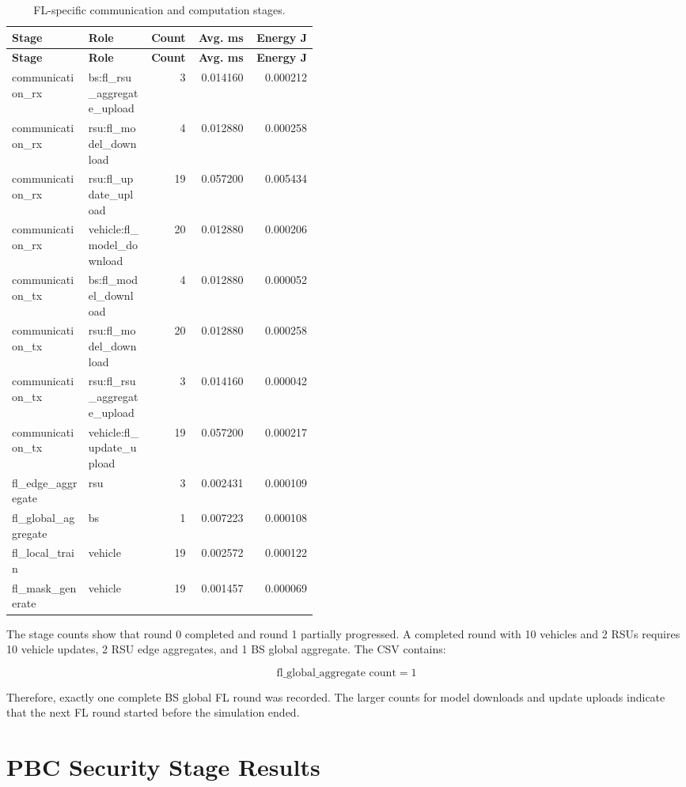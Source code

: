 \documentclass[11pt,a4paper]{article}
\begin{document}
\begin{longtable}{p{0.25\linewidth}p{0.20\linewidth}r r r}
\caption{FL-specific communication and computation stages.}\label{tab:fl-stages}\\
\toprule
\textbf{Stage} & \textbf{Role} & \textbf{Count} & \textbf{Avg. ms} & \textbf{Energy J} \\
\midrule
\endfirsthead
\toprule
\textbf{Stage} & \textbf{Role} & \textbf{Count} & \textbf{Avg. ms} & \textbf{Energy J} \\
\midrule
\endhead
communication\_rx & bs:fl\_rsu\_aggregate\_upload & 3 & 0.014160 & 0.000212 \\
communication\_rx & rsu:fl\_model\_download & 4 & 0.012880 & 0.000258 \\
communication\_rx & rsu:fl\_update\_upload & 19 & 0.057200 & 0.005434 \\
communication\_rx & vehicle:fl\_model\_download & 20 & 0.012880 & 0.000206 \\
communication\_tx & bs:fl\_model\_download & 4 & 0.012880 & 0.000052 \\
communication\_tx & rsu:fl\_model\_download & 20 & 0.012880 & 0.000258 \\
communication\_tx & rsu:fl\_rsu\_aggregate\_upload & 3 & 0.014160 & 0.000042 \\
communication\_tx & vehicle:fl\_update\_upload & 19 & 0.057200 & 0.000217 \\
fl\_edge\_aggregate & rsu & 3 & 0.002431 & 0.000109 \\
fl\_global\_aggregate & bs & 1 & 0.007223 & 0.000108 \\
fl\_local\_train & vehicle & 19 & 0.002572 & 0.000122 \\
fl\_mask\_generate & vehicle & 19 & 0.001457 & 0.000069 \\
\bottomrule
\end{longtable}

The stage counts show that round 0 completed and round 1 partially progressed.
A completed round with 10 vehicles and 2 RSUs requires 10 vehicle updates, 2 RSU
edge aggregates, and 1 BS global aggregate. The CSV contains:

\[
\text{fl\_global\_aggregate count}=1
\]

Therefore, exactly one complete BS global FL round was recorded. The larger
counts for model downloads and update uploads indicate that the next FL round
started before the simulation ended.

\section{PBC Security Stage Results}
\end{document}
